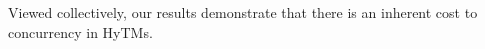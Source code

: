 Viewed collectively, our results demonstrate that there is an inherent cost to concurrency in HyTMs.

%